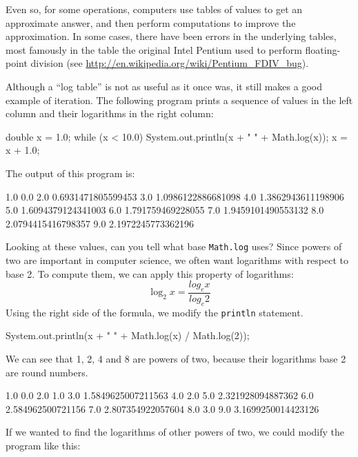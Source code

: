 \documentclass[12pt]{book}
\theoremstyle{exercise}
\newcommand{\java}[1]{\verb"#1"}
\newcommand{\java}[1]{\lstinline{#1}} %
\begin{document}

Even so, for some operations, computers use tables of values to get an approximate answer, and then perform computations to improve the approximation.
In some cases, there have been errors in the underlying tables, most famously in the table the original Intel Pentium used to perform floating-point division (see \url{http://en.wikipedia.org/wiki/Pentium_FDIV_bug}).

Although a ``log table'' is not as useful as it once was, it still makes a good example of iteration.
The following program prints a sequence of values in the left column and their logarithms in the right column:

\begin{code}
    double x = 1.0;
    while (x < 10.0) {
        System.out.println(x + "   " + Math.log(x));
        x = x + 1.0;
    }
\end{code}

The output of this program is:

\begin{stdout}
1.0   0.0
2.0   0.6931471805599453
3.0   1.0986122886681098
4.0   1.3862943611198906
5.0   1.6094379124341003
6.0   1.791759469228055
7.0   1.9459101490553132
8.0   2.0794415416798357
9.0   2.1972245773362196
\end{stdout}

Looking at these values, can you tell what base \java{Math.log} uses?
Since powers of two are important in computer science, we often want logarithms with respect to base 2.
To compute them, we can apply this property of logarithms:
%
\[ \log_2 x = \frac{log_e x}{log_e 2} \]
%
Using the right side of the formula, we modify the \java{println} statement.

\begin{code}
    System.out.println(x + "   " + Math.log(x) / Math.log(2));
\end{code}

We can see that 1, 2, 4 and 8 are powers of two, because their logarithms base 2 are round numbers.

\begin{stdout}
1.0   0.0
2.0   1.0
3.0   1.5849625007211563
4.0   2.0
5.0   2.321928094887362
6.0   2.584962500721156
7.0   2.807354922057604
8.0   3.0
9.0   3.1699250014423126
\end{stdout}

If we wanted to find the logarithms of other powers of two, we could modify the program like this:
\end{document}
